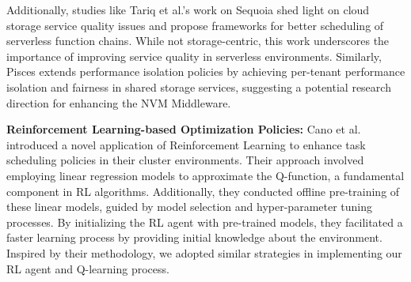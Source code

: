 Additionally, studies like Tariq et al.'s work on Sequoia \cite{tariq2020sequoia} shed light on cloud storage service quality issues and propose frameworks for better scheduling of serverless function chains. While not storage-centric, this work underscores the importance of improving service quality in serverless environments. Similarly, Pisces \cite{180275} extends performance isolation policies by achieving per-tenant performance isolation and fairness in shared storage services, suggesting a potential research direction for enhancing the NVM Middleware.

\textbf{Reinforcement Learning-based Optimization Policies:} Cano et al. \cite{cano2017curator} introduced a novel application of Reinforcement Learning to enhance task scheduling policies in their cluster environments. Their approach involved employing linear regression models to approximate the Q-function, a fundamental component in RL algorithms. Additionally, they conducted offline pre-training of these linear models, guided by model selection and hyper-parameter tuning processes. By initializing the RL agent with pre-trained models, they facilitated a faster learning process by providing initial knowledge about the environment. Inspired by their methodology, we adopted similar strategies in implementing our RL agent and Q-learning process.





